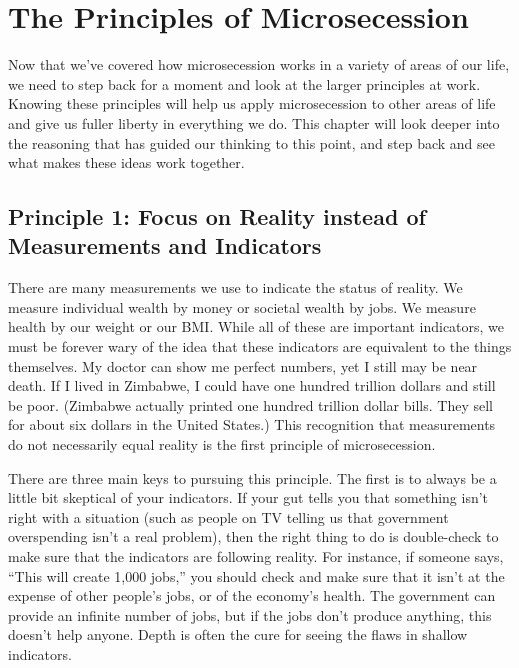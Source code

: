 \chapter{The Principles of Microsecession}

Now that we've covered how microsecession works in a
variety of areas of our life, we need to step back for a moment and
look at the larger principles at work. Knowing these principles will
help us apply microsecession to other areas of life and give us fuller
liberty in everything we do.  This chapter will look deeper into the
reasoning that has guided our thinking to this point, and step back and
see what makes these ideas work together.

\section{Principle 1: Focus on Reality instead of Measurements and Indicators}

There are many measurements we use to indicate the status of reality. We
measure individual wealth by money or societal wealth by jobs. We
measure health by our weight
or our BMI. While all
of these are important indicators, we must be forever wary
of the idea that
these indicators are equivalent to the things themselves. My doctor can
show me perfect numbers, yet I still may be near death. If I lived in
Zimbabwe, I could have one hundred trillion dollars and still be poor.
(Zimbabwe actually printed one hundred trillion dollar bills. They sell
for about six dollars in the United States.)
This recognition that
measurements do not necessarily equal reality is the first principle of
microsecession.

There are three main keys to pursuing this principle. The first is to
always be a little bit skeptical of your indicators. If your gut tells
you that something isn't right with a situation (such
as people on TV telling us that government overspending
isn't a real problem), then the right thing to do is
double-check to make sure that the indicators are following reality.
For instance, if someone says, ``This will create 1,000 jobs,'' you
should check and make sure that it isn't at the
expense of other people’s jobs, or of the economy's
health. The government can provide an infinite number of jobs, but if
the jobs
don't produce anything, this doesn't
help anyone. Depth is often the cure for seeing the flaws in shallow
indicators.

